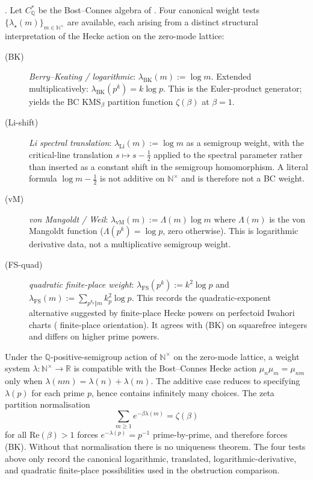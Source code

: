 \begin{definition}
\label{v4-arith:hpar-det:def:candidate-weights}
\ClaimStatusDefinitional. Let \(C^{*}_{\mathbb{Q}}\) be the
Bost--Connes algebra of
. Four canonical weight tests
\(\{\lambda_{\star}(m)\}_{m\in\mathbb{N}^{\times}}\) are available,
each arising from a distinct structural interpretation of the
Hecke action on the zero-mode lattice:
\begin{description}
\item[(BK)] \emph{Berry--Keating / logarithmic}:
\(\lambda_{\mathrm{BK}}(m):=\log m\). Extended multiplicatively:
\(\lambda_{\mathrm{BK}}(p^{k})=k\log p\). This is the Euler-product
generator; yields the BC KMS\({}_{\beta}\) partition function
\(\zeta(\beta)\) at \(\beta=1\).
\item[(Li-shift)] \emph{Li spectral translation}:
\(\lambda_{\mathrm{Li}}(m):=\log m\) as a semigroup weight, with the
critical-line translation \(s\mapsto s-\frac12\) applied to the
spectral parameter rather than inserted as a constant shift in the
semigroup homomorphism. A literal formula
\(\log m-\frac12\) is not additive on
\(\mathbb{N}^{\times}\) and is therefore not a BC weight.
\item[(vM)] \emph{von Mangoldt / Weil}:
\(\lambda_{\mathrm{vM}}(m):=\Lambda(m)\log m\) where
\(\Lambda(m)\) is the von Mangoldt function
(\(\Lambda(p^{k})=\log p\), zero otherwise). This is logarithmic
derivative data, not a multiplicative semigroup weight.
\item[(FS-quad)] \emph{quadratic finite-place weight}:
\(\lambda_{\mathrm{FS}}(p^{k}):=k^{2}\log p\) and
\(\lambda_{\mathrm{FS}}(m):=\sum_{p^{k_{p}}\Vert m}k_{p}^{2}\log p\).
This records the quadratic-exponent alternative suggested by
finite-place Hecke powers on perfectoid Iwahori charts
( finite-place orientation). It agrees
with (BK) on squarefree integers and differs on higher prime powers.
\end{description}
\end{definition}

\begin{remark}
\label{v4-arith:hpar-det:rem:four-exhaust}
Under the \(\mathbb{Q}\)-positive-semigroup action of
\(\mathbb{N}^{\times}\) on the zero-mode lattice, a weight system
\(\lambda:\mathbb{N}^{\times}\to\mathbb{R}\) is compatible with the
Bost--Connes Hecke action
\(\mu_{n}\mu_{m}=\mu_{nm}\) only when
\(\lambda(nm)=\lambda(n)+\lambda(m)\). The additive case reduces to
specifying \(\lambda(p)\) for each prime \(p\), hence contains infinitely
many choices. The zeta partition normalisation
\[
 \sum_{m\ge 1} e^{-\beta\lambda(m)}=\zeta(\beta)
\]
for all \(\mathrm{Re}(\beta)>1\) forces \(e^{-\lambda(p)}=p^{-1}\)
prime-by-prime, and therefore forces (BK). Without that normalisation
there is no uniqueness theorem. The four tests above only record the
canonical logarithmic, translated, logarithmic-derivative, and
quadratic finite-place possibilities used in the obstruction comparison.
\end{remark}

